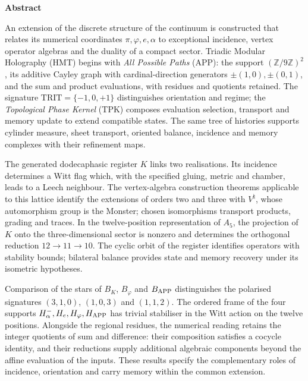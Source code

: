 \begin{center}\textbf{Abstract}\end{center}
\begingroup
\fontsize{9.5}{10.7}\selectfont
\setlength{\parskip}{1.5pt plus .5pt minus .5pt}
\noindent
An extension of the discrete structure of the continuum is constructed
that relates its numerical coordinates \(\pi,\varphi,e,\alpha\) to exceptional incidence,
vertex operator algebras and the duality of a compact sector.
Triadic Modular Holography (HMT) begins with \emph{All Possible Paths}
(APP): the support \((\mathbb Z/9\mathbb Z)^2\), its additive Cayley graph
with cardinal-direction generators \(\pm(1,0),\pm(0,1)\), and the sum
and product evaluations, with residues and quotients retained. The
signature \(\mathrm{TRIT}=\{-1,0,+1\}\) distinguishes orientation and
regime; the \emph{Topological Phase Kernel} (TPK) composes evaluation
selection, transport and memory update to extend compatible states.
The same tree of histories supports cylinder measure, sheet transport,
oriented balance, incidence and memory complexes with their refinement maps.

The generated dodecaphasic register \(K\) links two realisations.
Its incidence determines a Witt flag which, with the specified gluing,
metric and chamber, leads to a Leech neighbour. The vertex-algebra
construction theorems applicable to this lattice identify the extensions
of orders two and three with \(V^\natural\), whose automorphism group is
the Monster; chosen isomorphisms transport products, grading and traces.
In the twelve-position representation of \(A_5\), the projection of
\(K\) onto the three-dimensional sector is nonzero and determines the
orthogonal reduction \(12\to11\to10\). The cyclic orbit of the register
identifies operators with stability bounds; bilateral balance provides
state and memory recovery under its isometric hypotheses.

Comparison of the stars of \(B_K\), \(B_\varphi\) and \(B_{\rm APP}\) distinguishes
the polarised signatures \((3,1,0)\), \((1,0,3)\) and \((1,1,2)\).
The ordered frame of the four supports
\(H^-_\alpha,H_e,H_\varphi,H_{\rm APP}\) has trivial stabiliser
in the Witt action on the twelve positions. Alongside the regional
residues, the numerical reading retains the integer quotients of
sum and difference: their composition satisfies a cocycle identity,
and their reductions supply additional algebraic components beyond
the affine evaluation of the inputs. These results specify the
complementary roles of incidence, orientation and carry memory
within the common extension.

